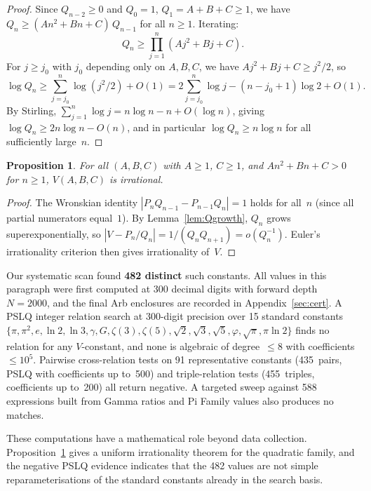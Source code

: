 \documentclass[11pt,a4paper]{article}
\theoremstyle{plain}
\newtheorem{proposition}[theorem]{Proposition}
\theoremstyle{definition}
\theoremstyle{remark}
\begin{document}
\begin{proof}
Since $Q_{n-2} \ge 0$ and $Q_0 = 1$, $Q_1 = A{+}B{+}C \ge 1$,
we have $Q_n \ge (An^2{+}Bn{+}C)\,Q_{n-1}$ for all $n \ge 1$.
Iterating:
\[
  Q_n \ge \prod_{j=1}^{n}(Aj^2{+}Bj{+}C).
\]
For $j \ge j_0$ with $j_0$ depending only on $A,B,C$, we have
$Aj^2{+}Bj{+}C \ge j^2/2$, so
\[
  \log Q_n
  \ge \sum_{j=j_0}^{n} \log(j^2/2) + O(1)
  = 2\sum_{j=j_0}^{n}\log j - (n{-}j_0{+}1)\log 2 + O(1).
\]
By Stirling, $\sum_{j=1}^{n}\log j = n\log n - n + O(\log n)$,
giving $\log Q_n \ge 2n\log n - O(n)$, and in particular
$\log Q_n \ge n\log n$ for all sufficiently large~$n$.
\end{proof}

\begin{proposition}\label{prop:irrat}
For all $(A,B,C)$ with $A \ge 1$, $C \ge 1$, and
$An^2 + Bn + C > 0$ for $n \ge 1$, $V(A,B,C)$ is irrational.
\end{proposition}

\begin{proof}
The Wronskian identity
$|P_n Q_{n-1} - P_{n-1} Q_n| = 1$ holds for all~$n$
(since all partial numerators equal~$1$).
By Lemma~\ref{lem:Qgrowth}, $Q_n$ grows superexponentially,
so $|V - P_n/Q_n| = 1/(Q_n Q_{n+1}) = o(Q_n^{-1})$.
Euler's irrationality criterion then gives irrationality of~$V$.
\end{proof}

Our systematic scan found \textbf{482 distinct} such constants.
All values in this paragraph were first computed at $300$ decimal digits with
forward depth $N=2000$, and the final Arb enclosures are recorded in
Appendix~\ref{sec:cert}.
A PSLQ \citep{ferguson1999} integer relation search at 300-digit precision over 15
standard constants
$\{\pi, \pi^2, e, \ln 2, \ln 3, \gamma, G, \zeta(3), \zeta(5),
\sqrt{2}, \sqrt{3}, \sqrt{5}, \varphi, \sqrt{\pi}, \pi\ln 2\}$
finds no relation for any $V$-constant, and none is algebraic of
degree~$\le 8$ with coefficients~$\le 10^5$.
Pairwise cross-relation tests on 91 representative constants
(435~pairs, PSLQ with coefficients up to~500) and triple-relation
tests (455~triples, coefficients up to~200) all return negative.
A targeted sweep against 588 expressions built from Gamma ratios
and Pi Family values also produces no matches.

These computations have a mathematical role beyond data collection.
Proposition~\ref{prop:irrat} gives a uniform irrationality theorem for the
quadratic family, and the negative PSLQ evidence indicates that the 482 values
are not simple reparameterisations of the standard constants already in the
search basis.
\end{document}
